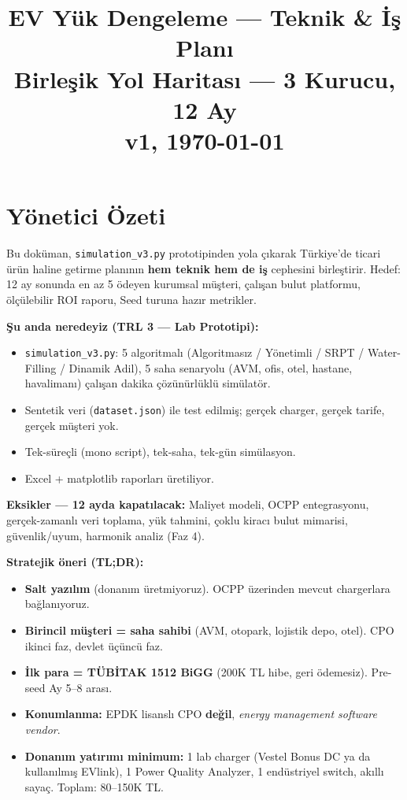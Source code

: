\documentclass[11pt,a4paper]{article}
\title{\textbf{EV Yük Dengeleme — Teknik \& İş Planı}\\
       \large Birleşik Yol Haritası — 3 Kurucu, 12 Ay\\
       \normalsize v1, \today}
\author{}
\date{}
\begin{document}
\maketitle
\tableofcontents
\newpage

\section{Yönetici Özeti}

Bu doküman, \texttt{simulation\_v3.py} prototipinden yola çıkarak Türkiye'de ticari ürün haline getirme planının \textbf{hem teknik hem de iş} cephesini birleştirir. Hedef: 12 ay sonunda en az 5 ödeyen kurumsal müşteri, çalışan bulut platformu, ölçülebilir ROI raporu, Seed turuna hazır metrikler.

\begin{notebox}
\textbf{Şu anda neredeyiz (TRL 3 — Lab Prototipi):}
\begin{itemize}
    \item \texttt{simulation\_v3.py}: 5 algoritmalı (Algoritmasız / Yönetimli / SRPT / Water-Filling / Dinamik Adil), 5 saha senaryolu (AVM, ofis, otel, hastane, havalimanı) çalışan dakika çözünürlüklü simülatör.
    \item Sentetik veri (\texttt{dataset.json}) ile test edilmiş; gerçek charger, gerçek tarife, gerçek müşteri yok.
    \item Tek-süreçli (mono script), tek-saha, tek-gün simülasyon.
    \item Excel + matplotlib raporları üretiliyor.
\end{itemize}
\textbf{Eksikler — 12 ayda kapatılacak:} Maliyet modeli, OCPP entegrasyonu, gerçek-zamanlı veri toplama, yük tahmini, çoklu kiracı bulut mimarisi, güvenlik/uyum, harmonik analiz (Faz 4).
\end{notebox}

\textbf{Stratejik öneri (TL;DR):}
\begin{itemize}
    \item \textbf{Salt yazılım} (donanım üretmiyoruz). OCPP üzerinden mevcut chargerlara bağlanıyoruz.
    \item \textbf{Birincil müşteri = saha sahibi} (AVM, otopark, lojistik depo, otel). CPO ikinci faz, devlet üçüncü faz.
    \item \textbf{İlk para = TÜBİTAK 1512 BiGG} (200K TL hibe, geri ödemesiz). Pre-seed Ay 5--8 arası.
    \item \textbf{Konumlanma:} EPDK lisanslı CPO \textbf{değil}, \textit{energy management software vendor}.
    \item \textbf{Donanım yatırımı minimum:} 1 lab charger (Vestel Bonus DC ya da kullanılmış EVlink), 1 Power Quality Analyzer, 1 endüstriyel switch, akıllı sayaç. Toplam: 80--150K TL.
\end{itemize}
\end{document}
